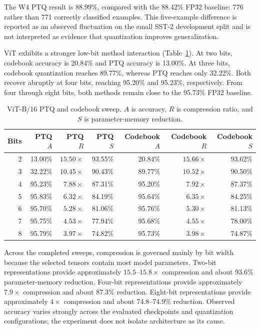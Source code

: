 \documentclass[conference]{IEEEtran}
\begin{document}
The W4 PTQ result is 88.99\%, compared with the 88.42\% FP32 baseline: 776 rather than 771 correctly classified examples. This five-example difference is reported as an observed fluctuation on the small SST-2 development split and is not interpreted as evidence that quantization improves generalization.

ViT exhibits a stronger low-bit method interaction (Table~\ref{tab:vit-sweep}). At two bits, codebook accuracy is 20.84\% and PTQ accuracy is 13.00\%. At three bits, codebook quantization reaches 89.77\%, whereas PTQ reaches only 32.22\%. Both recover abruptly at four bits, reaching 95.20\% and 95.23\%, respectively. From four through eight bits, both methods remain close to the 95.73\% FP32 baseline.

\begin{table}[t]
\caption{ViT-B/16 PTQ and codebook sweep. $A$ is accuracy, $R$ is compression ratio, and $S$ is parameter-memory reduction.}
\label{tab:vit-sweep}
\centering
\small
\begin{tabular}{@{}rrrrrrr@{}}
\toprule
Bits & PTQ $A$ & PTQ $R$ & PTQ $S$ & Codebook $A$ & Codebook $R$ & Codebook $S$ \\
\midrule
2 & 13.00\% & $15.50\times$ & 93.55\% & 20.84\% & $15.66\times$ & 93.62\% \\
3 & 32.22\% & $10.45\times$ & 90.43\% & 89.77\% & $10.52\times$ & 90.50\% \\
4 & 95.23\% & $7.88\times$ & 87.31\% & 95.20\% & $7.92\times$ & 87.37\% \\
5 & 95.83\% & $6.32\times$ & 84.19\% & 95.64\% & $6.35\times$ & 84.25\% \\
6 & 95.70\% & $5.28\times$ & 81.06\% & 95.76\% & $5.30\times$ & 81.13\% \\
7 & 95.75\% & $4.53\times$ & 77.94\% & 95.68\% & $4.55\times$ & 78.00\% \\
8 & 95.79\% & $3.97\times$ & 74.82\% & 95.73\% & $3.98\times$ & 74.87\% \\
\bottomrule
\end{tabular}
\end{table}

Across the completed sweeps, compression is governed mainly by bit width because the selected tensors contain most model parameters. Two-bit representations provide approximately $15.5$--$15.8\times$ compression and about 93.6\% parameter-memory reduction. Four-bit representations provide approximately $7.9\times$ compression and about 87.3\% reduction. Eight-bit representations provide approximately $4\times$ compression and about 74.8--74.9\% reduction. Observed accuracy varies strongly across the evaluated checkpoints and quantization configurations; the experiment does not isolate architecture as its cause.
\end{document}
